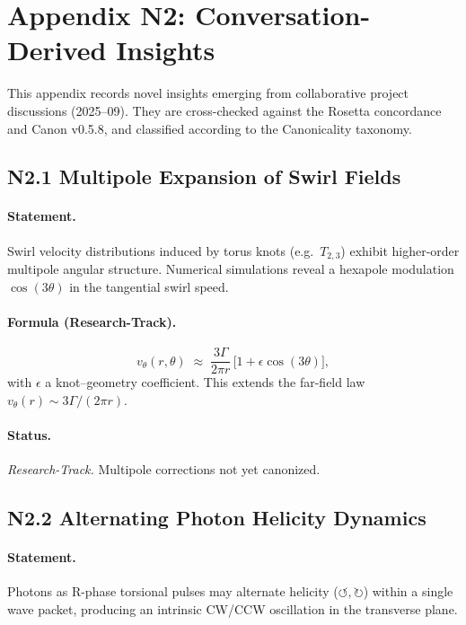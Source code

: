 \documentclass[10pt,reprint,aps,onecolumn,nofootinbib]{revtex4-2}
\begin{document}
    \section*{Appendix N2: Conversation-Derived Insights}
    \label{app:conv_insights}

    This appendix records novel insights emerging from collaborative project discussions
    (2025–09). They are cross-checked against the Rosetta concordance and Canon v0.5.8,
    and classified according to the Canonicality taxonomy.

    \subsection*{N2.1 Multipole Expansion of Swirl Fields}
        \paragraph{Statement.}
            Swirl velocity distributions induced by torus knots (e.g.\ $T_{2,3}$) exhibit higher-order
            multipole angular structure. Numerical simulations reveal a hexapole modulation
            $\cos(3\theta)$ in the tangential swirl speed.

        \paragraph{Formula (Research-Track).}
            \[
                v_\theta(r,\theta) \;\approx\; \frac{3\Gamma}{2\pi r}\,\Big[1 + \epsilon \cos(3\theta)\Big],
            \]
            with $\epsilon$ a knot–geometry coefficient. This extends the far-field law
            $v_\theta(r)\sim 3\Gamma/(2\pi r)$.

        \paragraph{Status.} \emph{Research-Track.} Multipole corrections not yet canonized.

    \subsection*{N2.2 Alternating Photon Helicity Dynamics}
    \paragraph{Statement.}
        Photons as R-phase torsional pulses may alternate helicity ($\circlearrowleft,\circlearrowright$) within
        a single wave packet, producing an intrinsic CW/CCW oscillation in the transverse plane.
\end{document}
